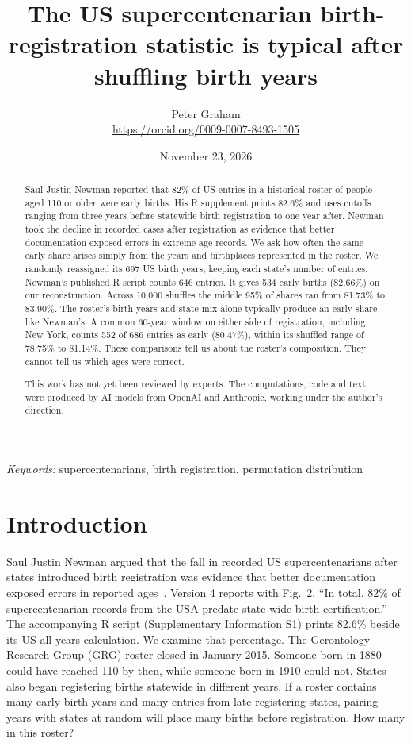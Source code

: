 \documentclass[11pt]{article}
\title{The US supercentenarian birth-registration statistic is typical after shuffling birth years}
\author{Peter Graham\\ \small\url{https://orcid.org/0009-0007-8493-1505}}
\date{November 23, 2026}
\begin{document}
\maketitle
\begin{abstract}
Saul Justin Newman reported that 82\% of US entries in a historical roster of people aged 110 or older were early births. His R supplement prints 82.6\% and uses cutoffs ranging from three years before statewide birth registration to one year after. Newman took the decline in recorded cases after registration as evidence that better documentation exposed errors in extreme-age records. We ask how often the same early share arises simply from the years and birthplaces represented in the roster. We randomly reassigned its 697 US birth years, keeping each state's number of entries. Newman's published R script counts 646 entries. It gives 534 early births (82.66\%) on our reconstruction. Across 10,000 shuffles the middle 95\% of shares ran from 81.73\% to 83.90\%. The roster's birth years and state mix alone typically produce an early share like Newman's. A common 60-year window on either side of registration, including New York, counts 552 of 686 entries as early (80.47\%), within its shuffled range of 78.75\% to 81.14\%. These comparisons tell us about the roster's composition. They cannot tell us which ages were correct.

This work has not yet been reviewed by experts. The computations, code and text were produced by AI models from OpenAI and Anthropic, working under the author's direction.
\end{abstract}
\medskip
\noindent\textit{Keywords:} supercentenarians, birth registration, permutation distribution

\section{Introduction}
Saul Justin Newman argued that the fall in recorded US supercentenarians after states introduced birth registration was evidence that better documentation exposed errors in reported ages~\cite{newman,morbid}. Version 4 reports with Fig.~2, “In total, 82\% of supercentenarian records from the USA predate state-wide birth certification.” The accompanying R script (Supplementary Information S1) prints 82.6\% beside its US all-years calculation. We examine that percentage. The Gerontology Research Group (GRG) roster closed in January 2015. Someone born in 1880 could have reached 110 by then, while someone born in 1910 could not. States also began registering births statewide in different years. If a roster contains many early birth years and many entries from late-registering states, pairing years with states at random will place many births before registration. How many in this roster?
\end{document}
